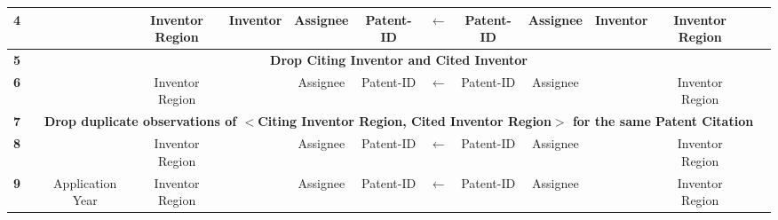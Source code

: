 \begin{sidewaystable}[htbp]
\begin{tabular}{|c|c|c|c|c|c|c|c|c|c|c|c|c|c|}
\midrule
\textbf{4} & \cellcolor[rgb]{ .988,  .894,  .839} & \cellcolor[rgb]{ .988,  .894,  .839} & \multicolumn{1}{p{5em}|}{\cellcolor[rgb]{ .988,  .894,  .839}Inventor Region} & \cellcolor[rgb]{ .988,  .894,  .839}Inventor & \cellcolor[rgb]{ .988,  .894,  .839}Assignee & \cellcolor[rgb]{ .988,  .894,  .839}Patent-ID & \textbf{$\leftarrow$} & \cellcolor[rgb]{ .741,  .843,  .933}Patent-ID & \cellcolor[rgb]{ .741,  .843,  .933}Assignee & \cellcolor[rgb]{ .741,  .843,  .933}Inventor & \multicolumn{1}{p{5em}|}{\cellcolor[rgb]{ .741,  .843,  .933}Inventor Region} & \cellcolor[rgb]{ .741,  .843,  .933} & \cellcolor[rgb]{ .741,  .843,  .933} \\
\midrule
\textbf{5} & \multicolumn{13}{c|}{\cellcolor[rgb]{ .886,  .937,  .855}\textbf{Drop Citing Inventor and Cited Inventor}} \\
\midrule
\textbf{6} & \cellcolor[rgb]{ .988,  .894,  .839} & \cellcolor[rgb]{ .988,  .894,  .839} & \multicolumn{1}{p{5em}|}{\cellcolor[rgb]{ .988,  .894,  .839}Inventor Region} & \cellcolor[rgb]{ .988,  .894,  .839} & \cellcolor[rgb]{ .988,  .894,  .839}Assignee & \cellcolor[rgb]{ .988,  .894,  .839}Patent-ID & \textbf{$\leftarrow$} & \cellcolor[rgb]{ .741,  .843,  .933}Patent-ID & \cellcolor[rgb]{ .741,  .843,  .933}Assignee & \cellcolor[rgb]{ .741,  .843,  .933} & \multicolumn{1}{p{5em}|}{\cellcolor[rgb]{ .741,  .843,  .933}Inventor Region} & \cellcolor[rgb]{ .741,  .843,  .933} & \cellcolor[rgb]{ .741,  .843,  .933} \\
\midrule
\textbf{7} & \multicolumn{13}{c|}{\cellcolor[rgb]{ .886,  .937,  .855}\textbf{Drop duplicate observations of $<$Citing Inventor Region, Cited Inventor Region$>$ for the same Patent Citation}} \\
\midrule
\textbf{8} & \cellcolor[rgb]{ .988,  .894,  .839} & \cellcolor[rgb]{ .988,  .894,  .839} & \multicolumn{1}{p{5em}|}{\cellcolor[rgb]{ .988,  .894,  .839}Inventor Region} & \cellcolor[rgb]{ .988,  .894,  .839} & \cellcolor[rgb]{ .988,  .894,  .839}Assignee & \cellcolor[rgb]{ .988,  .894,  .839}Patent-ID & \textbf{$\leftarrow$} & \cellcolor[rgb]{ .741,  .843,  .933}Patent-ID & \cellcolor[rgb]{ .741,  .843,  .933}Assignee & \cellcolor[rgb]{ .741,  .843,  .933} & \multicolumn{1}{p{5em}|}{\cellcolor[rgb]{ .741,  .843,  .933}Inventor Region} & \cellcolor[rgb]{ .741,  .843,  .933} & \cellcolor[rgb]{ .741,  .843,  .933} \\
\midrule
\textbf{9} & \cellcolor[rgb]{ .988,  .894,  .839} & \multicolumn{1}{p{5em}|}{\cellcolor[rgb]{ .988,  .894,  .839}Application Year} & \multicolumn{1}{p{5em}|}{\cellcolor[rgb]{ .988,  .894,  .839}Inventor Region} & \cellcolor[rgb]{ .988,  .894,  .839} & \cellcolor[rgb]{ .988,  .894,  .839}Assignee & \cellcolor[rgb]{ .988,  .894,  .839}Patent-ID & \textbf{$\leftarrow$} & \cellcolor[rgb]{ .741,  .843,  .933}Patent-ID & \cellcolor[rgb]{ .741,  .843,  .933}Assignee & \cellcolor[rgb]{ .741,  .843,  .933} & \multicolumn{1}{p{5em}|}{\cellcolor[rgb]{ .741,  .843,  .933}Inventor Region} & \cellcolor[rgb]{ .741,  .843,  .933} & \cellcolor[rgb]{ .741,  .843,  .933} \\

\end{tabular}
\end{sidewaystable}
